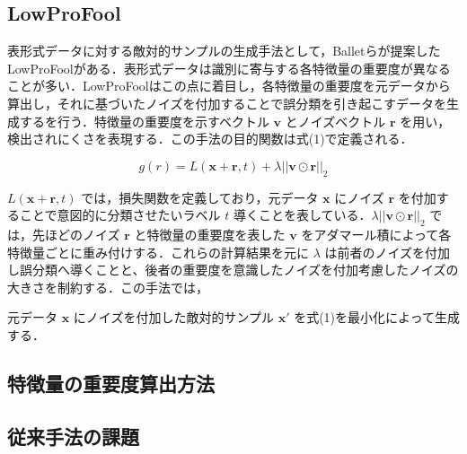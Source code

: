 

\subsection{LowProFool}
表形式データに対する敵対的サンプルの生成手法として，Balletらが提案したLowProFool\cite{ballet2019imperceptible}がある．表形式データは識別に寄与する各特徴量の重要度が異なることが多い．LowProFoolはこの点に着目し，各特徴量の重要度を元データから算出し，それに基づいたノイズを付加することで誤分類を引き起こすデータを生成するを行う．特徴量の重要度を示すベクトル $\bm{v}$ とノイズベクトル $\bm{r}$ を用い，検出されにくさを表現する．この手法の目的関数は式(1)で定義される．

\begin{equation}
g(r) = L(\bm{x}+\bm{r}, t) + \lambda ||\bm{v} \odot \bm{r}||_2 \tag{1}
\end{equation}

 $L(\bm{x}+\bm{r}, t)$ では，損失関数を定義しており，元データ $\bm{x}$ にノイズ $\bm{r}$ を付加することで意図的に分類させたいラベル $t$ 導くことを表している．$\lambda ||\bm{v} \odot \bm{r}||_2$ では，先ほどのノイズ $\bm{r}$ と特徴量の重要度を表した $\bm{v}$ をアダマール積によって各特徴量ごとに重み付けする．これらの計算結果を元に $\lambda$ は前者のノイズを付加し誤分類へ導くことと、後者の重要度を意識したノイズを付加考慮したノイズの大きさを制約する．この手法では，

元データ $\bm{x}$ にノイズを付加した敵対的サンプル $\bm{x}'$ を式(1)を最小化によって生成する．

\subsection{特徴量の重要度算出方法}

\subsection{従来手法の課題}